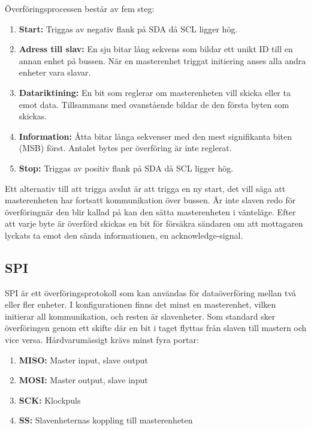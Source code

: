 \documentclass[11pt]{article}
\begin{document}
\begin{flushleft}
Överföringsprocessen består av fem steg: 

\begin{enumerate}
	\item \textbf{Start:} Triggas av negativ flank på SDA då SCL ligger hög.
	\item \textbf{Adress till slav:} En sju bitar lång sekvens som bildar ett unikt ID till en annan enhet på bussen. När en masterenhet triggat initiering anses alla andra enheter vara slavar.
	\item \textbf{Datariktining:} En bit som reglerar om masterenheten vill skicka eller ta emot data. Tillsammans med ovanstående bildar de den första byten som skickas.
	\item \textbf{Information:} Åtta bitar långa sekvenser med den mest signifikanta biten (MSB) först. Antalet bytes per överföring är inte reglerat.
	\item \textbf{Stop:} Triggas av positiv flank på SDA då SCL ligger hög.
\end{enumerate}

Ett alternativ till att trigga avslut är att trigga en ny start, det vill säga att masterenheten har fortsatt kommunikation över bussen. Är inte slaven redo för överföringnär den blir kallad på kan den sätta masterenheten i vänteläge. Efter att varje byte är överförd skickas en bit för försäkra sändaren om att mottagaren lyckats ta emot den sända informationen, en acknowledge-signal. \cite{guideI2CPhilips}

\subsection{SPI}
SPI är ett överföringsprotokoll som kan användas för dataöverföring mellan två eller fler enheter. I konfigurationen finns det minst en masterenhet, vilken initierar all kommunikation, och resten är slavenheter. Som standard sker överföringen genom ett skifte där en bit i taget flyttas från slaven till mastern och vice versa. Hårdvarumässigt krävs minst fyra portar:

\pagebreak

\begin{enumerate}
	\item \textbf{MISO:} Master input, slave output
	\item \textbf{MOSI:} Master output, slave input
	\item \textbf{SCK:} Klockpuls
	\item \textbf{SS:} Slavenheternas koppling till masterenheten
\end{enumerate}


\end{flushleft}
\end{document}
